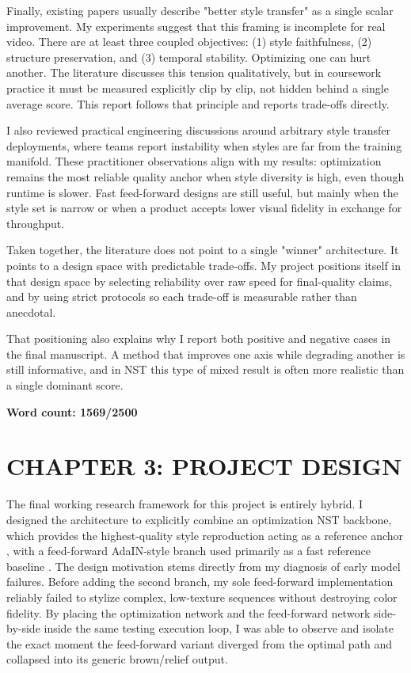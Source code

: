 \documentclass[12pt,letterpaper]{article}
\begin{document}
Finally, existing papers usually describe "better style transfer" as a single scalar improvement. My experiments suggest that this framing is incomplete for real video. There are at least three coupled objectives: (1) style faithfulness, (2) structure preservation, and (3) temporal stability. Optimizing one can hurt another. The literature discusses this tension qualitatively, but in coursework practice it must be measured explicitly clip by clip, not hidden behind a single average score. This report follows that principle and reports trade-offs directly.

I also reviewed practical engineering discussions around arbitrary style transfer deployments, where teams report instability when styles are far from the training manifold. These practitioner observations align with my results: optimization remains the most reliable quality anchor when style diversity is high, even though runtime is slower. Fast feed-forward designs are still useful, but mainly when the style set is narrow or when a product accepts lower visual fidelity in exchange for throughput.

Taken together, the literature does not point to a single "winner" architecture. It points to a design space with predictable trade-offs. My project positions itself in that design space by selecting reliability over raw speed for final-quality claims, and by using strict protocols so each trade-off is measurable rather than anecdotal.

That positioning also explains why I report both positive and negative cases in the final manuscript. A method that improves one axis while degrading another is still informative, and in NST this type of mixed result is often more realistic than a single dominant score.

\textbf{Word count: 1569/2500}

\setcounter{section}{3}
\setcounter{subsection}{0}
\section*{CHAPTER 3: PROJECT DESIGN}
The final working research framework for this project is entirely hybrid. I designed the architecture to explicitly combine an optimization NST backbone, which provides the highest-quality style reproduction acting as a reference anchor \cite{gatys2016}, with a feed-forward AdaIN-style branch used primarily as a fast reference baseline \cite{huang2017}. The design motivation stems directly from my diagnosis of early model failures. Before adding the second branch, my sole feed-forward implementation reliably failed to stylize complex, low-texture sequences without destroying color fidelity. By placing the optimization network and the feed-forward network side-by-side inside the same testing execution loop, I was able to observe and isolate the exact moment the feed-forward variant diverged from the optimal path and collapsed into its generic brown/relief output.
\end{document}
